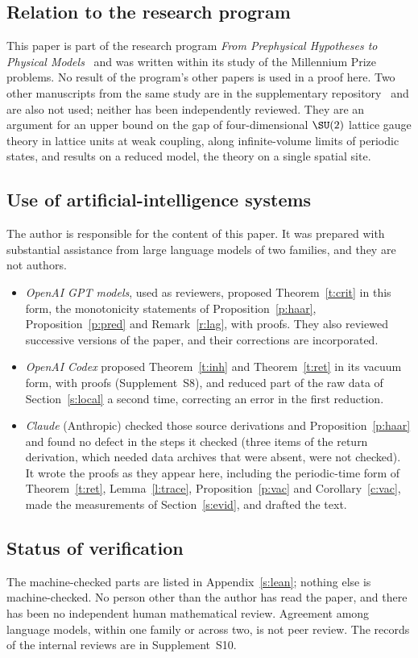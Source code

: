\subsection*{Relation to the research program}
This paper is part of the research program \emph{From Prephysical Hypotheses to Physical
Models}~\cite{Prog} and was written within its study of the Millennium Prize problems. No result of the
program's other papers is used in a proof here. Two other manuscripts from the same study are in the
supplementary repository~\cite{Supp} and are also not used; neither has been independently reviewed. They
are an argument for an upper bound on the gap of four-dimensional $\SU(2)$ lattice gauge theory in lattice
units at weak coupling, along infinite-volume limits of periodic states, and results on a reduced model, the
theory on a single spatial site.

\subsection*{Use of artificial-intelligence systems}
The author is responsible for the content of this paper. It was prepared with substantial assistance from
large language models of two families, and they are not authors.
\begin{itemize}
\item \emph{OpenAI GPT models}, used as reviewers, proposed Theorem~\ref{t:crit} in this form, the
monotonicity statements of Proposition~\ref{p:haar}, Proposition~\ref{p:pred} and Remark~\ref{r:lag}, with
proofs. They also reviewed successive versions of the paper, and their corrections are incorporated.
\item \emph{OpenAI Codex} proposed Theorem~\ref{t:inh} and Theorem~\ref{t:ret} in its vacuum form, with proofs
(Supplement~S8), and reduced part of the raw data of Section~\ref{s:local} a second time, correcting an error
in the first reduction.
\item \emph{Claude} (Anthropic) checked those source derivations and Proposition~\ref{p:haar} and found no
defect in the steps it checked (three items of the return derivation, which needed data archives that were
absent, were not checked). It wrote the proofs as they appear here, including the periodic-time form of
Theorem~\ref{t:ret}, Lemma~\ref{l:trace}, Proposition~\ref{p:vac} and Corollary~\ref{c:vac}, made the
measurements of Section~\ref{s:evid}, and drafted the text.
\end{itemize}

\subsection*{Status of verification}
The machine-checked parts are listed in Appendix~\ref{s:lean}; nothing else is machine-checked. No person
other than the author has read the paper, and there has been no independent human mathematical review.
Agreement among language models, within one family or across two, is not peer review. The records of the
internal reviews are in Supplement~S10.

